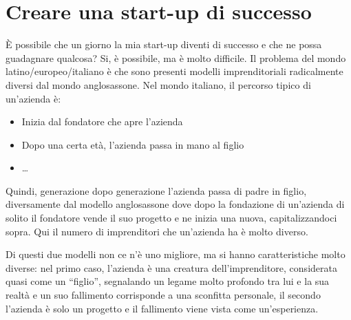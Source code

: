 \section{Creare una start-up di successo}

È possibile che un giorno la mia start-up diventi di successo e che ne possa
guadagnare qualcosa? Si, è possibile, ma è molto difficile.
Il problema del mondo latino/europeo/italiano è che sono presenti modelli
imprenditoriali radicalmente diversi dal mondo anglosassone.
Nel mondo italiano, il percorso tipico di un'azienda è:
\begin{itemize}
 \item Inizia dal fondatore che apre l'azienda
 \item Dopo una certa età, l'azienda passa in mano al figlio
 \item \dots
\end{itemize}
Quindi, generazione dopo generazione l'azienda passa di padre in figlio,
diversamente dal modello anglosassone dove dopo la fondazione di
un'azienda di solito il fondatore vende il suo progetto e ne inizia una nuova,
capitalizzandoci sopra. Qui il numero di imprenditori che un'azienda ha è molto
diverso.

Di questi due modelli non ce n'è uno migliore, ma si hanno caratteristiche
molto diverse: nel primo caso, l'azienda è una creatura dell'imprenditore,
considerata quasi come un ``figlio'', segnalando un legame molto profondo tra
lui e la sua realtà e un suo fallimento corrisponde a una sconfitta personale,
il secondo l'azienda è solo un progetto e il fallimento viene vista come
un'esperienza.
